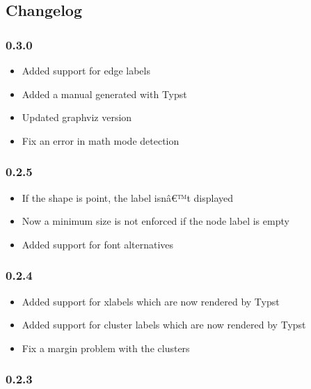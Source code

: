 \subsection{Changelog}\label{changelog}

\subsubsection{0.3.0}\label{section}

\begin{itemize}
\tightlist
\item
  Added support for edge labels
\item
  Added a manual generated with Typst
\item
  Updated graphviz version
\item
  Fix an error in math mode detection
\end{itemize}

\subsubsection{0.2.5}\label{section-1}

\begin{itemize}
\tightlist
\item
  If the shape is point, the label isnâ€™t displayed
\item
  Now a minimum size is not enforced if the node label is empty
\item
  Added support for font alternatives
\end{itemize}

\subsubsection{0.2.4}\label{section-2}

\begin{itemize}
\tightlist
\item
  Added support for xlabels which are now rendered by Typst
\item
  Added support for cluster labels which are now rendered by Typst
\item
  Fix a margin problem with the clusters
\end{itemize}

\subsubsection{0.2.3}\label{section-3}

